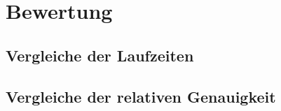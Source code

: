 \chapter{Bewertung}

\section{Vergleiche der Laufzeiten}

\section{Vergleiche der relativen Genauigkeit}


